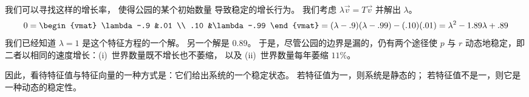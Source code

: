我们可以寻找这样的增长率，
使得公园的某个初始数量
导致稳定的增长行为。
我们考虑 $\lambda\vec{v}=T\vec{v}$ 并解出 $\lambda$。
\begin{equation*}
  0=\begin{vmat}
    \lambda-.9  &.01  \\
    .10         &\lambda-.99
  \end{vmat}
  =(\lambda-.9)(\lambda-.99)-(.10)(.01)
  =\lambda^2-1.89\lambda+.89
\end{equation*}
我们已经知道 $\lambda=1$ 是这个特征方程的一个解。
另一个解是 $0.89$。
于是，尽管公园的边界是漏的，仍有两个途径使 $p$ 与 $r$
动态地稳定，即二者以相同的速度增长：(i)~世界数量既不增长也不萎缩，
以及 (ii)~世界数量每年萎缩
$11\%$。

因此，看待特征值与特征向量的一种方式是：它们给出系统的一个稳定状态。
若特征值为一，则系统是静态的；
若特征值不是一，则它是一种动态的稳定性。





